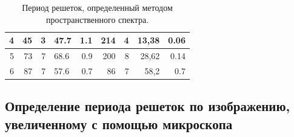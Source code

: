 \documentclass[a4paper,12pt]{article}
\begin{document}
\begin{table}[h!]
\begin{tabular}{|r|r|r|l|r|r|r|r|r|}
4                                                                        & 45                                                                              & 3                                                                           & 47.7                               & 1.1                                                                                    & 214                                                      & 4                                                                           & 13,38                                                    & \cellcolor[HTML]{FFFFFF}0.06                                                           \\ \hline
5                                                                        & 73                                                                              & 7                                                                           & 68.6                               & 0.9                                                                                    & 200                                                      & 8                                                                           & 28,62                                                    & \cellcolor[HTML]{FFFFFF}0.14                                                           \\ \hline
6                                                                        & 87                                                                              & 7                                                                           & 57.6                               & 0.7                                                                                    & 86                                                       & 7                                                                           & 58,2                                                     & \cellcolor[HTML]{FFFFFF}0.7                                                            \\ \hline
\end{tabular}
\caption{Период решеток, определенный методом пространственного спектра.}
\label{tab:my-table}
\end{table}

\subsection{Определение периода решеток по изображению, увеличенному с помощью микроскопа}
	
\end{document}
